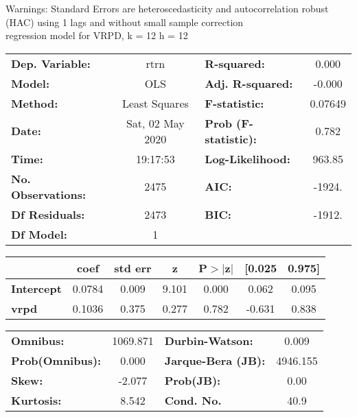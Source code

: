 Warnings: \newline
 [1] Standard Errors are heteroscedasticity and autocorrelation robust (HAC) using 1 lags and without small sample correction\\ 

regression model for VRPD, k = 12 h = 12\begin{center}
\begin{tabular}{lclc}
\toprule
\textbf{Dep. Variable:}    &       rtrn       & \textbf{  R-squared:         } &     0.000   \\
\textbf{Model:}            &       OLS        & \textbf{  Adj. R-squared:    } &    -0.000   \\
\textbf{Method:}           &  Least Squares   & \textbf{  F-statistic:       } &   0.07649   \\
\textbf{Date:}             & Sat, 02 May 2020 & \textbf{  Prob (F-statistic):} &    0.782    \\
\textbf{Time:}             &     19:17:53     & \textbf{  Log-Likelihood:    } &    963.85   \\
\textbf{No. Observations:} &        2475      & \textbf{  AIC:               } &    -1924.   \\
\textbf{Df Residuals:}     &        2473      & \textbf{  BIC:               } &    -1912.   \\
\textbf{Df Model:}         &           1      & \textbf{                     } &             \\
\bottomrule
\end{tabular}
\begin{tabular}{lcccccc}
                   & \textbf{coef} & \textbf{std err} & \textbf{z} & \textbf{P$> |$z$|$} & \textbf{[0.025} & \textbf{0.975]}  \\
\midrule
\textbf{Intercept} &       0.0784  &        0.009     &     9.101  &         0.000        &        0.062    &        0.095     \\
\textbf{vrpd}      &       0.1036  &        0.375     &     0.277  &         0.782        &       -0.631    &        0.838     \\
\bottomrule
\end{tabular}
\begin{tabular}{lclc}
\textbf{Omnibus:}       & 1069.871 & \textbf{  Durbin-Watson:     } &    0.009  \\
\textbf{Prob(Omnibus):} &   0.000  & \textbf{  Jarque-Bera (JB):  } & 4946.155  \\
\textbf{Skew:}          &  -2.077  & \textbf{  Prob(JB):          } &     0.00  \\
\textbf{Kurtosis:}      &   8.542  & \textbf{  Cond. No.          } &     40.9  \\
\bottomrule
\end{tabular}
\end{center}

